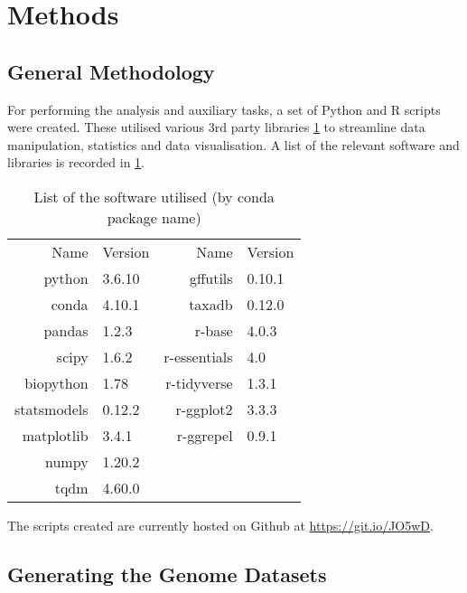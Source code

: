 \documentclass[../main.tex]{subfile}
\begin{document}
 \section{Methods}
    \subsection{General Methodology}
        For performing the analysis and auxiliary tasks, a set of Python and R scripts were created. These utilised various 3rd party libraries \cref{table:method/software} to streamline data manipulation, statistics and data visualisation. A list of the relevant software and libraries is recorded in \cref{table:method/software}.

        \begin{table}[H]
            \centering
            \caption{List of the software utilised (by conda package name)}
            \begin{tabular}{@{} *{2}{r l}}
                \toprule
                Name           & Version & Name           & Version \\
                \cmidrule{1-2}             \cmidrule(l){3-4}
                python         & 3.6.10  & gffutils       & 0.10.1  \\
                conda          & 4.10.1  & taxadb         & 0.12.0  \\
                pandas         & 1.2.3   & r-base         & 4.0.3   \\
                scipy          & 1.6.2   & r-essentials   & 4.0     \\
                biopython      & 1.78    & r-tidyverse    & 1.3.1   \\
                statsmodels    & 0.12.2  & r-ggplot2      & 3.3.3   \\
                matplotlib     & 3.4.1   & r-ggrepel      & 0.9.1   \\
                numpy          & 1.20.2  & & \\
                tqdm           & 4.60.0  & & \\
                \bottomrule
            \end{tabular}
            \label{table:method/software}
        \end{table}

        The scripts created are currently hosted on Github at \href{https://git.io/JO5wD}{https://git.io/JO5wD}.
    \subsection{Generating the Genome Datasets}
\end{document}

